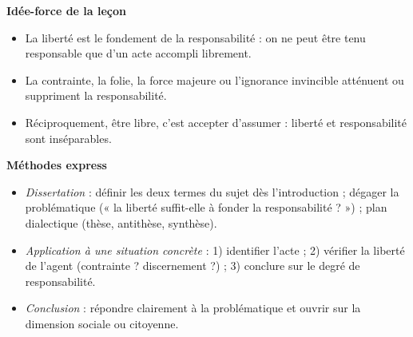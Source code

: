 \documentclass[11pt]{article}
\newcommand{\cle}[1]{{\popxbold\color{popdark}#1}}
\begin{document}
\begin{aretenir}
\textbf{Idée-force de la leçon}
\begin{itemize}
  \item La \cle{liberté} est le \cle{fondement} de la responsabilité : on ne peut être tenu responsable que d'un acte accompli librement.
  \item La contrainte, la folie, la force majeure ou l'ignorance invincible atténuent ou suppriment la responsabilité.
  \item Réciproquement, être libre, c'est accepter d'assumer : liberté et responsabilité sont inséparables.
\end{itemize}

\textbf{Méthodes express}
\begin{itemize}
  \item \emph{Dissertation} : définir les deux termes du sujet dès l'introduction ; dégager la problématique (« la liberté suffit-elle à fonder la responsabilité ? ») ; plan dialectique (thèse, antithèse, synthèse).
  \item \emph{Application à une situation concrète} : 1) identifier l'acte ; 2) vérifier la liberté de l'agent (contrainte ? discernement ?) ; 3) conclure sur le degré de responsabilité.
  \item \emph{Conclusion} : répondre clairement à la problématique et ouvrir sur la dimension sociale ou citoyenne.
\end{itemize}
\end{aretenir}
\end{document}
